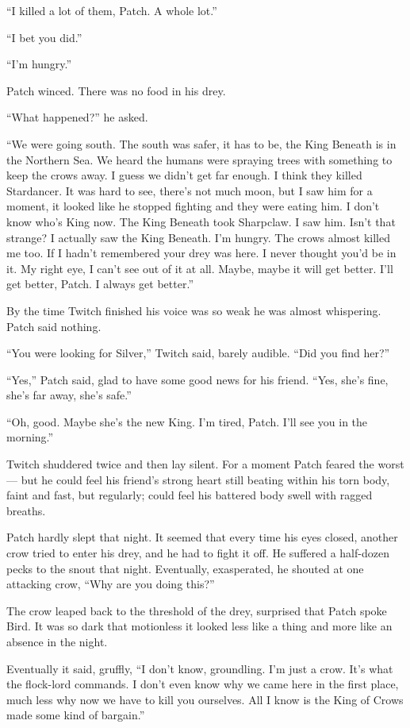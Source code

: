\documentclass[12pt]{memoir}
\begin{document}
“I killed a lot of them, Patch. A whole lot.”

“I bet you did.”

“I’m hungry.”

Patch winced. There was no food in his drey.

“What happened?” he asked.

“We were going south. The south was safer, it has to be, the King
Beneath is in the Northern Sea. We heard the humans were spraying
trees with something to keep the crows away. I guess we didn’t get far
enough. I think they killed Stardancer. It was hard to see, there’s
not much moon, but I saw him for a moment, it looked like he stopped
fighting and they were eating him. I don’t know who’s King now. The
King Beneath took Sharpclaw. I saw him. Isn’t that strange? I actually
saw the King Beneath. I’m hungry. The crows almost killed me too. If I
hadn’t remembered your drey was here. I never thought you’d be in
it. My right eye, I can’t see out of it at all. Maybe, maybe it will
get better. I’ll get better, Patch. I always get better.”

By the time Twitch finished his voice was so weak he was almost
whispering. Patch said nothing.

“You were looking for Silver,” Twitch said, barely audible. “Did you
find her?”

“Yes,” Patch said, glad to have some good news for his friend. “Yes,
she’s fine, she’s far away, she’s safe.”

“Oh, good. Maybe she’s the new King. I’m tired, Patch. I’ll see you in
the morning.”

Twitch shuddered twice and then lay silent. For a moment Patch feared
the worst — but he could feel his friend’s strong heart still beating
within his torn body, faint and fast, but regularly; could feel his
battered body swell with ragged breaths.

Patch hardly slept that night. It seemed that every time his eyes
closed, another crow tried to enter his drey, and he had to fight it
off. He suffered a half-dozen pecks to the snout that
night. Eventually, exasperated, he shouted at one attacking crow, “Why
are you doing this?”

The crow leaped back to the threshold of the drey, surprised that
Patch spoke Bird. It was so dark that motionless it looked less like a
thing and more like an absence in the night.

Eventually it said, gruffly, “I don’t know, groundling. I’m just a
crow. It’s what the flock-lord commands. I don’t even know why we came
here in the first place, much less why now we have to kill you
ourselves. All I know is the King of Crows made some kind of bargain.”
\end{document}
